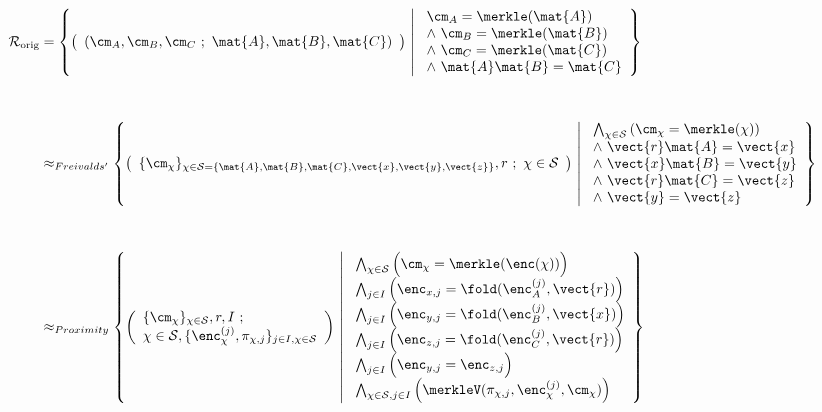 \begin{align*}
\mathcal{R}_{\text{orig}} &= \left\{
\left( 
\begin{array}{l}
(\cm_A,\cm_B,\cm_C \ ; \
\mat{A}, \mat{B}, \mat{C}) 
\end{array}
\right)
\ \middle\vert \
\begin{array}{l}
\cm_A = \merkle(\mat{A}) \\
\land \ \cm_B = \merkle(\mat{B}) 
\\
\land \ \cm_C = \merkle(\mat{C}) 
\\ 
\land \ \mat{A}\mat{B}=\mat{C}
\end{array}
\right\}
\\[1cm]
& \approx_{Freivalds'}
\left\{
\left( 
\begin{array}{l}
\{ \cm_{\chi} \}_{\chi \in \mathcal{S} = \{\mat{A}, \mat{B}, \mat{C}, \vect{x}, \vect{y}, \vect{z}\}}, r
 \ ; \ \chi \in \mathcal{S}
\end{array}
\right)
\ \middle\vert \
\begin{array}{l}
\bigwedge_{\chi \in \mathcal{S}} \left( \cm_{\chi} = \merkle(\chi) \right)
\\
\land \ \vect{r}\mat{A}=\vect{x} \\ 
\land \ \vect{x}\mat{B}=\vect{y} \\
\land \ \vect{r}\mat{C}=\vect{z} \\
\land \ \vect{y}=\vect{z}
\end{array}
\right\}
\\[1cm] 
& \approx_{Proximity}
\left\{
\left( 
\begin{array}{l}
\{ \cm_{\chi} \}_{\chi \in \mathcal{S}}, r, I \ ; \\ 
\chi \in \mathcal{S}, 
\{ \enc_{\chi}^{(j)}, \pi_{\chi,j} \}_{j \in I, \chi \in \mathcal{S}}
\end{array}
\right)
\ \middle\vert \
\begin{array}{l}
\bigwedge_{\chi \in \mathcal{S}} \Big( \cm_{\chi} = \merkle(\enc(\chi)) \Big)
\\
\bigwedge_{j \in I} \left( \enc_{x,j} = \fold(\enc_A^{(j)},\vect{r}) \right)
\\
\bigwedge_{j \in I} \left( \enc_{y,j} = \fold(\enc_B^{(j)},\vect{x}) \right)
\\
\bigwedge_{j \in I} \left( \enc_{z,j} = \fold(\enc_C^{(j)},\vect{r}) \right)
\\
\bigwedge_{j \in I} \Big( \enc_{y,j} = \enc_{z,j} \Big)
\\
\bigwedge_{\chi \in \mathcal{S}, j \in I} \left(  \merkleV(\pi_{\chi,j},\enc_{\chi}^{(j)},\cm_{\chi}) \right)
\end{array}
\right\}
\end{align*}